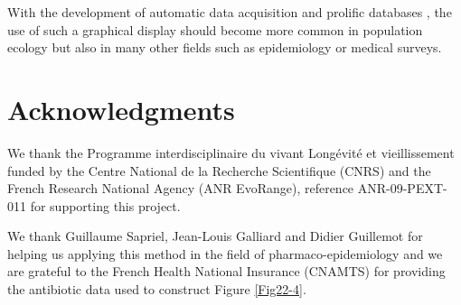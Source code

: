 With the development of automatic data acquisition and prolific databases
\autocite{le-galliard2012a,mallard2012a,mallard2013a}, the use of such a
graphical display should become more common in population ecology but also in many other fields such as epidemiology or medical
surveys.

\section{Acknowledgments}

We thank the Programme interdisciplinaire du vivant Longévité et vieillissement
funded by the Centre National de la Recherche Scientifique (CNRS) and the French
Research National Agency (ANR EvoRange), reference ANR-09-PEXT-011 for
supporting this project.

We thank Guillaume Sapriel, Jean-Louis Galliard and Didier Guillemot for helping
us applying this method in the field of pharmaco-epidemiology and we are
grateful to the French Health National Insurance (CNAMTS) for providing the
antibiotic data used to construct Figure \ref{Fig22-4}.